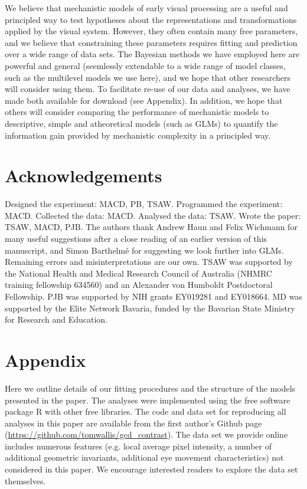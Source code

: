 \documentclass[11pt,a4paper]{article}
\begin{document}
{We believe that mechanistic models of early visual processing are a useful and principled way to test hypotheses about the representations and transformations applied by the visual system.
However, they often contain many free parameters, and we believe that constraining these parameters requires fitting and prediction over a wide range of data sets.
The Bayesian methods we have employed here are powerful \citep[allowing for detailed model analysis, see for example][]{Lee2014, Kruschke2011a} and general (seemlessly extendable to a wide range of model classes, such as the multilevel models we use here), and we hope that other researchers will consider using them.
To facilitate re-use of our data and analyses, we have made both available for download (see Appendix).
In addition, we hope that others will consider comparing the performance of mechanistic models to descriptive, simple and atheoretical models (such as GLMs) to quantify the information gain provided by mechanistic complexity in a principled way. 



\section*{Acknowledgements}

Designed the experiment: MACD, PB, TSAW.
Programmed the experiment: MACD.
Collected the data: MACD.
Analysed the data: TSAW.
Wrote the paper: TSAW, MACD, PJB.
The authors thank Andrew Haun and Felix Wichmann for many useful suggestions after a close reading of an earlier version of this manuscript, and Simon Barthelm\'{e} for suggesting we look further into GLMs.
Remaining errors and misinterpretations are our own.
TSAW was supported by the National Health and Medical Research Council of Australia (NHMRC training fellowship 634560) and an Alexander von Humboldt Postdoctoral Fellowship.
PJB was supported by NIH grants EY019281 and EY018664.
MD was supported by the Elite Network Bavaria, funded by the Bavarian State Ministry for Research and Education.


\section{Appendix}

Here we outline details of our fitting procedures and the structure of the models presented in the paper.
The analyses were implemented using the free software package R with other free libraries.
The code and data set for reproducing all analyses in this paper are available from the first author's Github page (\url{https://github.com/tomwallis/gcd_contrast}).
The data set we provide online includes numerous features (e.g. local average pixel intensity, a number of additional geometric invariants, additional eye movement characteristics) not considered in this paper.
We encourage interested readers to explore the data set themselves.

}
\end{document}
